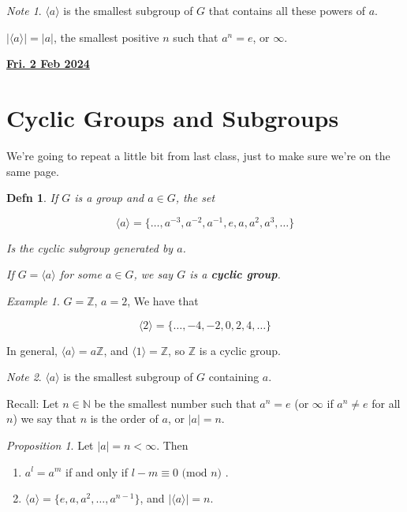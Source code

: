 \documentclass[12pt]{article}
\renewcommand{\date}[1]{\underline{\bf #1}}
\def\N{{\mathbb N}}
\def\Z{{\mathbb Z}}
\newcommand{\lr}[1]{\langle #1 \rangle}
\renewcommand{\mod}[1]{\text{ (mod $#1$) }}
\newtheorem{definition}{Defn}
\theoremstyle{remark}
\newtheorem{proposition}{Proposition}
\theoremstyle{remark}
\theoremstyle{remark}
\newtheorem{example}{Example}
\theoremstyle{remark}
\theoremstyle{remark}
\newtheorem*{note}{Note}
\begin{document}
\begin{note}
	$\langle a \rangle$ is the smallest subgroup of $G$ that contains all these
	powers of $a$.

	$|\langle a \rangle| = |a|$, the smallest positive $n$ such that $a^n = e$, or
	$\infty$.
\end{note}

\date{Fri. 2 Feb 2024}

\section{Cyclic Groups and Subgroups}

We're going to repeat a little bit from last class, just to make sure we're on
the same page.

\begin{definition}
	If $G$ is a group and $a \in G$, the set

	\[
		\lr {a} = \{\dots, a^{-3}, a^{-2}, a^{-1}, e, a, a^2 , a^3, \dots\}
	\]

	Is the cyclic subgroup generated by $a$.

	If $G = \lr{a}$ for some $a \in G$, we say $G$ is a {\bf cyclic group}.
\end{definition}

\begin{example}
	$G = \Z$, $a = 2$, We have that

	\[
		\lr {2} = \{\dots, -4, -2, 0, 2, 4, \dots\}
	\]

	In general, $\lr{a} = a\Z$, and $\lr {1} = \Z$, so $\Z$ is a cyclic group.
\end{example}

\begin{note}
	$\lr {a}$ is the smallest subgroup of $G$ containing $a$.
\end{note}

Recall: Let $n \in \N$ be the smallest number such that $a^n = e$ (or $\infty$
if $a^n \ne e$ for all $n$) we say that $n$ is the order of $a$, or $|a| = n$.

\begin{proposition}
  Let $|a| = n < \infty$. Then

  \begin{enumerate}
    \item $a^l = a^m$ if and only if $l - m \equiv 0 \mod n$.
    \item $\lr {a} = \{e, a, a^2, \dots, a^{n - 1}\}$, and $|\lr{a}| = n$.
  \end{enumerate}
\end{proposition}
\end{document}
